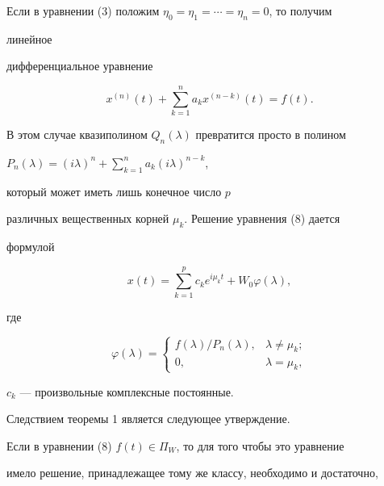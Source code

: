  


Если в уравнении (3) положим $\eta_0=\eta_1=\dotsb=\eta_n=0$, то получим 


линейное  


дифференциальное уравнение 


\begin{equation} 


x^{(n)}(t)+\sum^n_{k=1}a_k x^{(n-k)}(t)=f(t). 


\end{equation} 


В этом случае квазиполином $Q_n(\lambda)$ превратится просто в полином 


$P_n(\lambda)=(i\lambda)^n+\sum\limits^n_{k=1} a_k(i\lambda)^{n-k}$, 


который может иметь лишь конечное число $p$ 


различных вещественных корней $\mu_k$. Решение уравнения (8) дается 


формулой  


\begin{equation} 


x(t)=\sum^p_{k=1}c_k e^{i\mu_k t}+W_0\varphi(\lambda), 


\end{equation} 


где 


\begin{equation} 


\varphi(\lambda)= 


\begin{cases} 


f(\lambda)/P_n(\lambda), & \lambda\ne\mu_k;\\ 


0, & \lambda=\mu_k, 


\end{cases} 


\end{equation} 


$c_k$ --- произвольные комплексные постоянные. 


 


Следствием теоремы 1 является следующее утверждение. 


 


Если в уравнении (8)\; $f(t)\in\Pi_W$, то для того чтобы это уравнение  


имело решение, принадлежащее тому же классу, необходимо и достаточно,  


